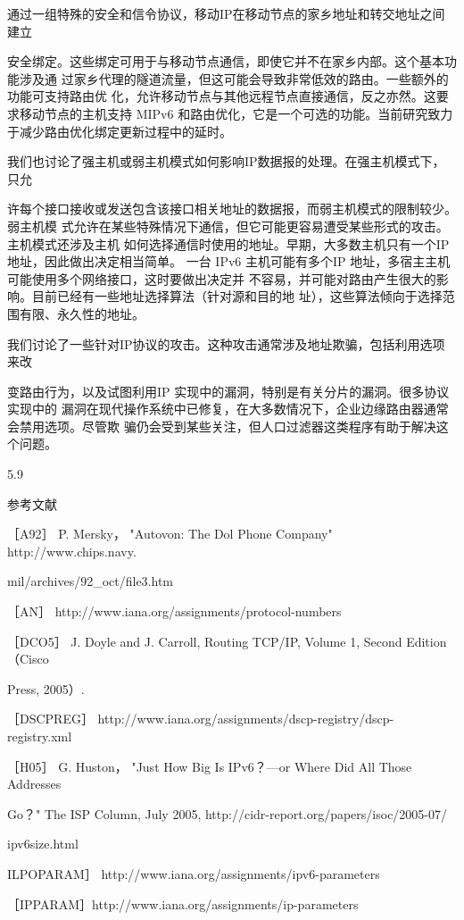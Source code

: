 通过一组特殊的安全和信令协议，移动IP在移动节点的家乡地址和转交地址之间建立

安全绑定。这些绑定可用于与移动节点通信，即使它并不在家乡内部。这个基本功能涉及通
过家乡代理的隧道流量，但这可能会导致非常低效的路由。一些额外的功能可支持路由优
化，允许移动节点与其他远程节点直接通信，反之亦然。这要求移动节点的主机支持 MIPv6
和路由优化，它是一个可选的功能。当前研究致力于减少路由优化绑定更新过程中的延时。

我们也讨论了强主机或弱主机模式如何影响IP数据报的处理。在强主机模式下，只允

许每个接口接收或发送包含该接口相关地址的数据报，而弱主机模式的限制较少。弱主机模
式允许在某些特殊情况下通信，但它可能更容易遭受某些形式的攻击。主机模式还涉及主机
如何选择通信时使用的地址。早期，大多数主机只有一个IP地址，因此做出决定相当简单。
一台 IPv6 主机可能有多个IP 地址，多宿主主机可能使用多个网络接口，这时要做出决定并
不容易，并可能对路由产生很大的影响。目前已经有一些地址选择算法（针对源和目的地
址），这些算法倾向于选择范围有限、永久性的地址。

我们讨论了一些针对IP协议的攻击。这种攻击通常涉及地址欺骗，包括利用选项来改

变路由行为，以及试图利用IP 实现中的漏洞，特别是有关分片的漏洞。很多协议实现中的
漏洞在现代操作系统中已修复，在大多数情况下，企业边缘路由器通常会禁用选项。尽管欺
骗仍会受到某些关注，但人口过滤器这类程序有助于解决这个问题。

5.9

参考文献

［A92］ P. Mersky， "Autovon: The Dol Phone Company" http://www.chips.navy.

mil/archives/92\_oct/file3.htm

［AN］ http://www.iana.org/assignments/protocol-numbers

［DCO5］ J. Doyle and J. Carroll, Routing TCP/IP, Volume 1, Second Edition （Cisco

Press, 2005）.

［DSCPREG］ http://www.iana.org/assignments/dscp-registry/dscp-registry.xml

［H05］ G. Huston， "Just How Big Is IPv6？—or Where Did All Those Addresses

Go？" The ISP Column, July 2005, http://cidr-report.org/papers/isoc/2005-07/

ipv6size.html

ILPOPARAM］ http://www.iana.org/assignments/ipv6-parameters

［IPPARAM］http://www.iana.org/assignments/ip-parameters


